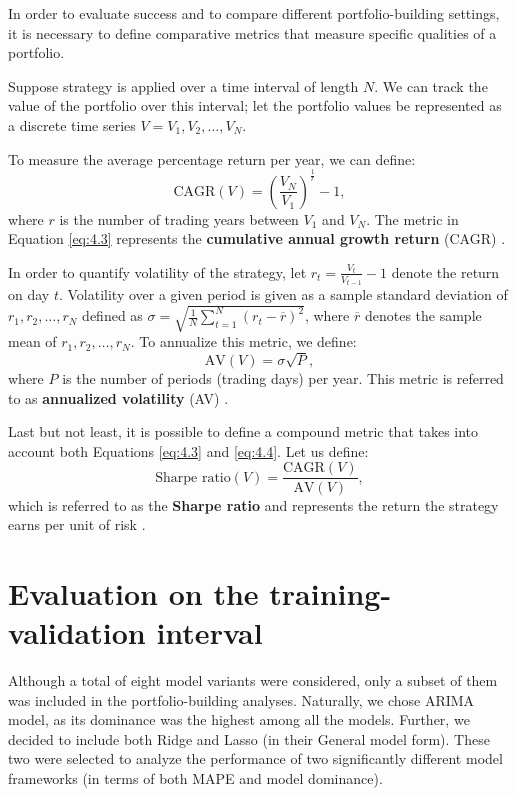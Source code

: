 In order to evaluate success and to compare different portfolio-building settings, it
is necessary to define comparative metrics that measure specific qualities of a portfolio.

Suppose strategy is applied over a time interval of length $N$. We can track the value of the portfolio over this interval; let
the portfolio values be represented as a discrete time series $V = V_1, V_2, \ldots, V_N$.

To measure the average percentage return per year, we can define:
\begin{equation}
    \label{eq:4.3}
    \text{CAGR}(V) = \left(\frac{V_N}{V_1}\right)^ {\frac{1}{r}} - 1 ,
\end{equation}
where $r$ is the number of trading years between $V_1$ and $V_N$. The metric in Equation \eqref{eq:4.3} represents the \textbf{cumulative annual growth return} (CAGR) \cite{portfolio}.

In order to quantify volatility of the strategy, let $r_t = \frac{V_t}{V_{t-1}} - 1$ denote the return on day $t$. Volatility over a given
period is given as a sample standard deviation of $r_1, r_2, \ldots, r_N$ defined as $\sigma = \sqrt{\frac{1}{N}\sum_{t=1}^N (r_t - \overline{r})^2}$, where $\overline{r}$ denotes
the sample mean of $r_1, r_2, \ldots, r_N$. To annualize this metric, we define:
\begin{equation}
    \label{eq:4.4}
    \text{AV}(V) = \sigma \sqrt{P},
\end{equation}
where $P$ is the number of periods (trading days) per year. This metric is referred to as \textbf{annualized volatility} (AV) \cite{portfolio}.

Last but not least, it is possible to define a compound metric that takes into account both Equations \eqref{eq:4.3} and \eqref{eq:4.4}. Let us define:
\begin{equation}
    \text{Sharpe ratio}(V) = \frac{\text{CAGR}(V)}{\text{AV}(V)},
\end{equation}
which is referred to as the \textbf{Sharpe ratio} and represents the return the strategy earns per unit of risk \cite{portfolio}.

\section{Evaluation on the training-validation interval}
Although a total of eight model variants were considered, only a subset of them was included in the portfolio-building analyses. Naturally, we chose ARIMA model, as its dominance was the highest among 
all the models. Further, we decided to include both Ridge and Lasso (in their General model form). These two were selected to analyze the performance of two significantly different model frameworks (in terms of both MAPE and model dominance).

